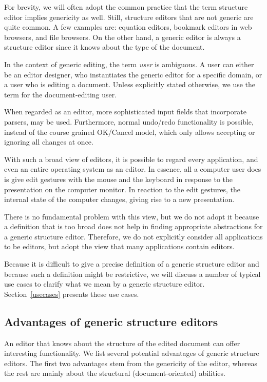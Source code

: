 \documentclass{speauth}
\begin{document}
For brevity, we will often adopt the common practice that the term structure editor implies genericity as well. Still, structure editors that are not generic are quite common. A few examples are: equation editors, bookmark editors in web browsers, and file browsers. On the other hand, a generic editor is always a structure editor since it knows about the type of the document.

In the context of generic editing, the term {\em user} is ambiguous. A user can either be an editor designer, who instantiates the generic editor for a specific domain, or a user who is editing a document. Unless explicitly stated otherwise, we use the term for the document-editing user.

\bc

When regarded as an editor, more sophisticated input fields that incorporate parsers, may be used. Furthermore, normal undo/redo functionality is possible, instead of the course grained OK/Cancel model, which only allows accepting or ignoring all changes at once.

\ec

\bc

With such a broad view of editors, it is possible to regard every application, and even an entire operating system as an editor. In essence, all a computer user does is give edit gestures with the mouse and the keyboard in response to the presentation on the computer monitor. In reaction to the edit gestures, the internal state of the computer changes, giving rise to a new presentation. 

There is no fundamental problem with this view, but we do not adopt it because a definition that is too broad does not help in finding appropriate abstractions for a generic structure editor. Therefore, we do not explicitly consider all applications to be editors, but adopt the view that many applications contain editors.

\ec

Because it is difficult to give a precise definition of a generic structure editor and because such a definition might be restrictive, we will discuss a number of typical use cases to clarify what we mean by a generic structure editor. Section~\ref{usecases} presents these use cases.

\subsection{Advantages of generic structure editors}
An editor that knows about the structure of the edited document can offer interesting functionality. We list several potential advantages of generic structure editors. The first two advantages stem from the genericity of the editor, whereas the rest are mainly about the structural (document-oriented) abilities.
\end{document}
